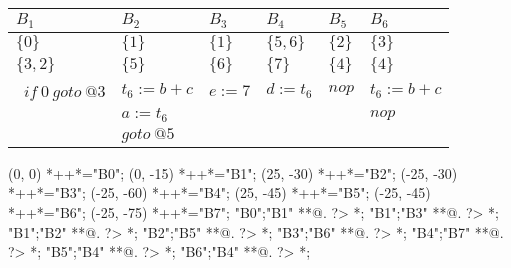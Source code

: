 \begin{table}[ht]
\begin{scriptsize}
\begin{tabular}{l|l|l|l|l|l}
$B_{1}$ & $B_{2}$ & $B_{3}$ & $B_{4}$ & $B_{5}$ & $B_{6}$ \\
\hline
$\{0\}$ & $\{1\}$ & $\{1\}$ & $\{5, 6\}$ & $\{2\}$ & $\{3\}$ \\
$\{3, 2\}$ & $\{5\}$ & $\{6\}$ & $\{7\}$ & $\{4\}$ & $\{4\}$ \\
\hline\
$if\:0\:goto\:@3$ & $t_{6}:=b+c$ & $e:=7$ & $d:=t_{6}$ & $nop$ & $t_{6}:=b+c$ \\
 & $a:=t_{6}$ &  &  &  & $nop$ \\
 & $goto\:@5$ &  &  &  &  \\
\end{tabular}
\end{scriptsize}
\end{table}

\begin{scriptsize}
\xy(0, 0)
	*++{}*\frm{-,}="B0";
(0, -15)
	*++{}*\frm{-,}="B1";
(25, -30)
	*++{}*\frm{-,}="B2";
(-25, -30)
	*++{}*\frm{-,}="B3";
(-25, -60)
	*++{}*\frm{-,}="B4";
(25, -45)
	*++{}*\frm{-,}="B5";
(-25, -45)
	*++{}*\frm{-,}="B6";
(-25, -75)
	*++{}*\frm{-,}="B7";
"B0";"B1" **@{.} ?> *{\dir{>}};
"B1";"B3" **@{.} ?> *{\dir{>}};
"B1";"B2" **@{.} ?> *{\dir{>}};
"B2";"B5" **@{.} ?> *{\dir{>}};
"B3";"B6" **@{.} ?> *{\dir{>}};
"B4";"B7" **@{.} ?> *{\dir{>}};
"B5";"B4" **@{.} ?> *{\dir{>}};
"B6";"B4" **@{.} ?> *{\dir{>}};
\endxy
\end{scriptsize}


